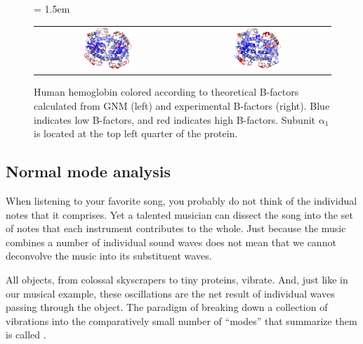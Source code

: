 \begin{figure}[h]
	\centering
	\tabcolsep = 1.5em
	\mySfFamily
	\begin{tabular}{c c}
		\includegraphics[width = 0.35\textwidth]{../images/hemoglobin_b-factors_theoretical.png} & \includegraphics[width = 0.35\textwidth]{../images/hemoglobin_b-factors_experimental.png}
	\end{tabular}
	\caption{Human hemoglobin colored according to theoretical B-factors calculated from GNM (left) and experimental B-factors (right). Blue indicates low B-factors, and red indicates high B-factors. Subunit $\text{α}_\text{1}$ is located at the top left quarter of the protein.}
	\label{fig:hemoglobin_b_factors}
\end{figure}

\FloatBarrier
{}
\subsection{Normal mode analysis}

When listening to your favorite song, you probably do not think of the individual notes that it comprises. Yet a talented musician can dissect the song into the set of notes that each instrument contributes to the whole. Just because the music combines a number of individual sound waves does not mean that we cannot deconvolve the music into its substituent waves.

All objects, from colossal skyscrapers to tiny proteins, vibrate. And, just like in our musical example, these oscillations are the net result of individual waves passing through the object. The paradigm of breaking down a collection of vibrations into the comparatively small number of ``modes'' that summarize them is called .

